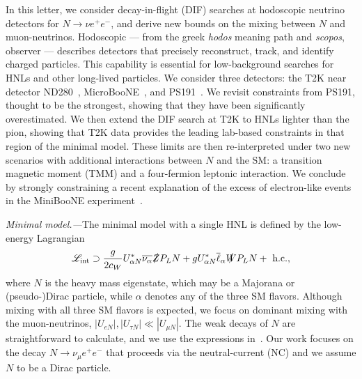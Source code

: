 \documentclass[
reprint,
superscriptaddress,
showpacs,
preprintnumbers,
bibnotes,
amsmath,
amssymb,
aps,
prd,
floatfix
]{revtex4-2}
\begin{document}
In this letter, we consider decay-in-flight (DIF) searches at hodoscopic neutrino detectors for $N\to \nu e^+e^-$, and derive new bounds on the mixing between $N$ and muon-neutrinos.
Hodoscopic --- from the greek \textit{hodos} meaning path and \textit{scopos}, observer --- describes detectors that precisely reconstruct, track, and identify charged particles. 
This capability is essential for low-background searches for HNLs and other long-lived particles.
We consider three detectors: the T2K near detector ND280~\cite{T2KND280TPC:2010nnd}, MicroBooNE~\cite{MicroBooNE:2016pwy}, and PS191~\cite{Bernardi:1985ny,Bernardi:1987ek}.
We revisit constraints from PS191, thought to be the strongest, showing that they have been significantly overestimated.
We then extend the DIF search at T2K to HNLs lighter than the pion, showing that T2K data provides the leading lab-based constraints in that region of the minimal model.
These limits are then re-interpreted under two new scenarios with additional interactions between $N$ and the SM: a transition magnetic moment (TMM) and a four-fermion leptonic interaction.
We conclude by strongly constraining a recent explanation of the excess of electron-like events in the MiniBooNE experiment~\cite{MiniBooNE:2018esg,MiniBooNE:2020pnu}.

\emph{Minimal model.---}The minimal model with a single HNL is defined by the low-energy Lagrangian
\begin{equation}
    \mathscr{L_{\rm int}} \supset \frac{g}{2 c_W} U_{\alpha N}^* \overline{\nu_\alpha} \slashed{Z} P_L N + g U_{\alpha N}^* \overline{\ell}_{\alpha} \slashed{W}  P_L N  + \text{ h.c.},
\end{equation}
where $N$ is the heavy mass eigenstate, which may be a Majorana or (pseudo-)Dirac particle, while $\alpha$ denotes any of the three SM flavors.
Although mixing with all three SM flavors is expected, we focus on dominant mixing with the muon-neutrinos, $|U_{e N}|, |U_{\tau N}| \ll |U_{\mu N}|$.
The weak decays of $N$ are straightforward to calculate, and we use the expressions in~\cite{Coloma:2020lgy}. 
Our work focuses on the decay $N \to \nu_\mu e^+e^-$ that proceeds via the neutral-current (NC) and we assume $N$ to be a Dirac particle. 
\end{document}
